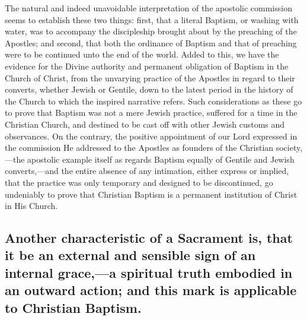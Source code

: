 \documentclass[]{book}
\begin{document}
The natural and indeed unavoidable interpretation of the apostolic commission seems to establish these two things: first, that a literal Baptism, or washing with water, was to accompany the discipleship brought about by the preaching of the Apostles; and second, that both the ordinance of Baptism and that of preaching were to be continued unto the end of the world. Added to this, we have the evidence for the Divine authority and permanent obligation of Baptism in the Church of Christ, from the unvarying practice of the Apostles in regard to their converts, whether Jewish or Gentile, down to the latest period in the history of the Church to which the inspired narrative refers. Such considerations as these go to prove that Baptism was not a mere Jewish practice, suffered for a time in the Christian Church, and destined to be cast off with other Jewish customs and observances. On the contrary, the positive appointment of our Lord expressed in the commission He addressed to the Apostles as founders of the Christian society,---the apostolic example itself as regards Baptism equally of Gentile and Jewish converts,---and the entire absence of any intimation, either express or implied, that the practice was only temporary and designed to be discontinued, go undeniably to prove that Christian Baptism is a permanent institution of Christ in His Church.

\hypertarget{another-characteristic-of-a-sacrament-is-that-it-be-an-external-and-sensible-sign-of-an-internal-gracea-spiritual-truth-embodied-in-an-outward-action-and-this-mark-is-applicable-to-christian-baptism.}{%
\subsection{Another characteristic of a Sacrament is, that it be an external and sensible sign of an internal grace,---a spiritual truth embodied in an outward action; and this mark is applicable to Christian Baptism.}\label{another-characteristic-of-a-sacrament-is-that-it-be-an-external-and-sensible-sign-of-an-internal-gracea-spiritual-truth-embodied-in-an-outward-action-and-this-mark-is-applicable-to-christian-baptism.}}
\end{document}
